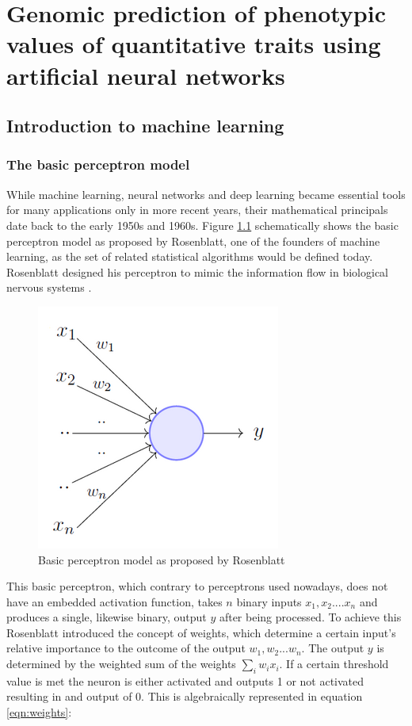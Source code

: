 \chapter{Genomic prediction of phenotypic values of quantitative
  traits using artificial neural networks}

\label{Chapter3} %


\section{Introduction to machine learning} \label{introml}
\subsection{The basic perceptron model}

While machine learning, neural networks and deep learning became essential tools for many
applications only in more recent years, their mathematical principals date back to the early
1950s and 1960s. Figure \ref{fig:perceptron} schematically shows the basic perceptron
model as proposed by Rosenblatt, one of the founders of machine learning, as the set of
related statistical algorithms would be defined today. Rosenblatt designed his perceptron
to mimic the information flow in biological nervous systems \cite{rosenblatt1961}.

\begin{figure}[th]
  \centering \includegraphics[height=.25\textheight, width=.5\textwidth]{Figures/perceptron.png}
  \decoRule
\caption[Basic perceptron model]{Basic perceptron model as proposed by Rosenblatt \cite{rosenblatt1961}}
\label{fig:perceptron}
\end{figure}


This basic perceptron, which contrary to perceptrons used nowadays, does not have an
embedded activation function, takes $n$ binary inputs $x_1 , x_2 .... x_n$ and produces a
single, likewise binary, output $y$ after being processed. To achieve this Rosenblatt
introduced the concept of weights, which determine a certain input's relative importance
to the outcome of the output $w_1 , w_2 ... w_n$. The output $y$ is determined by the
weighted sum of the weights $\sum_i w_ix_i $. If a certain threshold value is met the
neuron is either activated and outputs 1 or not activated resulting in and output of
0. This is algebraically represented in equation \ref{eqn:weights}:

